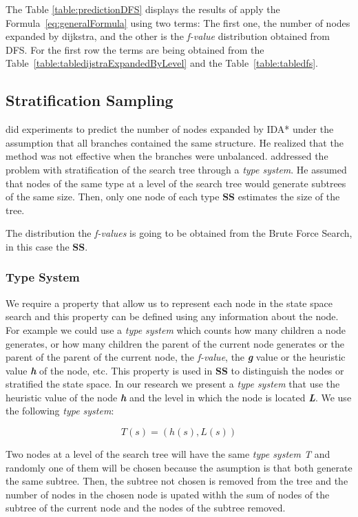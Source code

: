 \documentclass[11pt,a4paper,oneside]{report}
\begin{document}
The Table \ref{table:predictionDFS} displays the results of apply the Formula~\eqref{eq:generalFormula} using two terms: The first one, the number of nodes expanded by dijkstra, and the other is the \textit{f-value} distribution obtained from DFS. For the first row the terms are being obtained from the Table~\ref{table:tabledijstraExpandedByLevel} and the Table~\ref{table:tabledfs}.



\subsection{Stratification Sampling}
\cite{knuth1975Estimating} did experiments to predict the number of nodes expanded by IDA* under the assumption that all branches contained the same structure.  He realized that the method was not effective when the branches were unbalanced. \cite{chen1992heuristic} addressed the problem with stratification of the search tree through a \textit{type system}. He assumed that nodes of the same type at a level of the search tree would generate subtrees of the same size. Then, only one node of each type \textbf{SS} estimates the size of the tree.

The distribution the \textit{f-values} is going to be obtained from the Brute Force Search, in this case the \textbf{SS}.

\subsubsection{Type System}
We require a property that allow us to represent each node in the state space search and this property can be defined using any information about the node. For example we could use a \textit{type system} which counts how many children a node generates, or how many children the parent of the current node generates or the parent of the parent of the current node, the \textit{f-value}, the \textbf{\textit{g}} value or the heuristic value \textbf{\textit{h}} of the node, etc. \newline 
This property is used in \textbf{SS} to distinguish the nodes or stratified the state space. In our research we present a \textit{type system} that use the heuristic value of the node \textbf{\textit{h}} and the level in which the node is located \textbf{\textit{L}}. We use the following \textit{type system}:

\[  {T(s) = (h(s), L(s))}  \]

Two nodes at a level of the search tree will have the same \textit{type system T} and randomly one of them will be chosen because the asumption is that both generate the same subtree. Then, the subtree not chosen is removed from the tree and the number of nodes in the chosen node is upated withh the sum of nodes of the subtree of the current node and the nodes of the subtree removed.  
\end{document}
